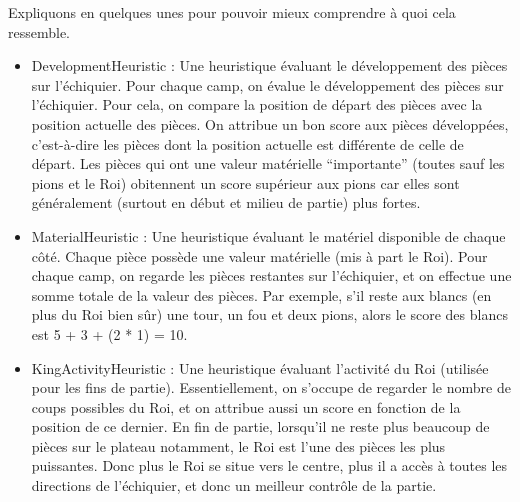 \documentclass{article}
\begin{document}
Expliquons en quelques unes pour pouvoir mieux comprendre à quoi cela ressemble.
\begin{itemize}
    \item DevelopmentHeuristic : Une heuristique évaluant le développement des pièces sur l'échiquier. Pour chaque camp, on évalue
    le développement des pièces sur l'échiquier. Pour cela, on compare la position de départ des pièces avec la position actuelle
    des pièces. On attribue un bon score aux pièces développées, c'est-à-dire les pièces dont la position actuelle est différente
    de celle de départ. Les pièces qui ont une valeur matérielle ``importante'' (toutes sauf les pions et le Roi) obitennent un score
    supérieur aux pions car elles sont généralement (surtout en début et milieu de partie) plus fortes.
    \item MaterialHeuristic : Une heuristique évaluant le matériel disponible de chaque côté. Chaque pièce possède une valeur matérielle 
    (mis à part le Roi). Pour chaque camp, on regarde les pièces restantes sur l'échiquier, et on effectue une somme totale de la valeur
    des pièces. Par exemple, s'il reste aux blancs (en plus du Roi bien sûr) une tour, un fou et deux pions, alors le score des blancs
    est 5 + 3 + (2 * 1) = 10.
    \item KingActivityHeuristic : Une heuristique évaluant l'activité du Roi (utilisée pour les fins de partie). Essentiellement, on
    s'occupe de regarder le nombre de coups possibles du Roi, et on attribue aussi un score en fonction de la position de ce dernier.
    En fin de partie, lorsqu'il ne reste plus beaucoup de pièces sur le plateau notamment, le Roi est l'une des pièces les plus
    puissantes. Donc plus le Roi se situe vers le centre, plus il a accès à toutes les directions de l'échiquier, et donc un meilleur
    contrôle de la partie.
\end{itemize}
\end{document}
